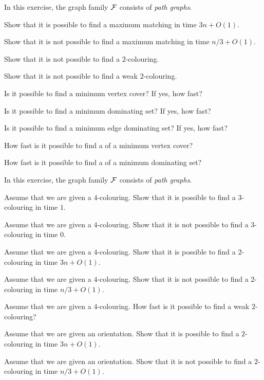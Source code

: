 \begin{ex}
    In this exercise, the graph family $\mathcal{F}$ consists of \emph{path graphs}.
    \begin{subex}
        \item Show that it is possible to find a maximum matching in time $3n+O(1)$.
        \item Show that it is not possible to find a maximum matching in time $n/3+O(1)$.
        \item Show that it is not possible to find a $2$-colouring.
        \item Show that it is not possible to find a weak $2$-colouring.
        \item Is it possible to find a minimum vertex cover? If yes, how fast?
        \item Is it possible to find a minimum dominating set? If yes, how fast?
        \item Is it possible to find a minimum edge dominating set? If yes, how fast?
        \item How fast is it possible to find a  of a minimum vertex cover?
        \item How fast is it possible to find a  of a minimum dominating set?
    \end{subex}
\end{ex}

\begin{ex}
    In this exercise, the graph family $\mathcal{F}$ consists of \emph{path graphs}.
    \begin{subex}
        \item Assume that we are given a $4$-colouring. Show that it is possible to find a $3$-colouring in time $1$.
        \item Assume that we are given a $4$-colouring. Show that it is not possible to find a $3$-colouring in time $0$.
        \item Assume that we are given a $4$-colouring. Show that it is possible to find a $2$-colouring in time $3n+O(1)$.
        \item Assume that we are given a $4$-colouring. Show that it is not possible to find a $2$-colouring in time $n/3+O(1)$.
        \item Assume that we are given a $4$-colouring. How fast is it possible to find a weak $2$-colouring?
        \item Assume that we are given an orientation. Show that it is possible to find a $2$-colouring in time $3n+O(1)$.
        \item Assume that we are given an orientation. Show that it is not possible to find a $2$-colouring in time $n/3+O(1)$.
    \end{subex}
\end{ex}

